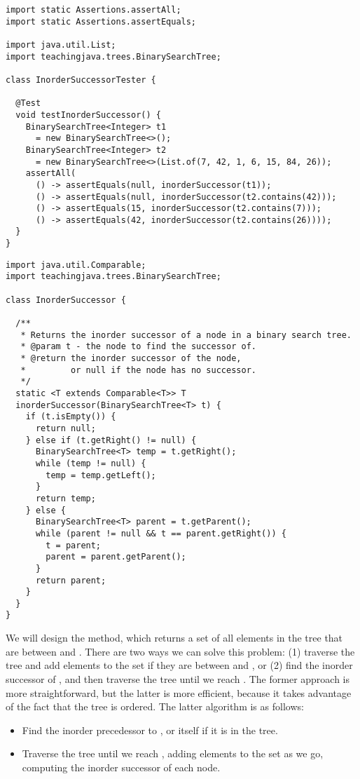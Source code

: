 \begin{lstlisting}[language=MyJava]
import static Assertions.assertAll;
import static Assertions.assertEquals;

import java.util.List;
import teachingjava.trees.BinarySearchTree;

class InorderSuccessorTester {

  @Test
  void testInorderSuccessor() {
    BinarySearchTree<Integer> t1 
      = new BinarySearchTree<>();
    BinarySearchTree<Integer> t2 
      = new BinarySearchTree<>(List.of(7, 42, 1, 6, 15, 84, 26));
    assertAll(
      () -> assertEquals(null, inorderSuccessor(t1));
      () -> assertEquals(null, inorderSuccessor(t2.contains(42)));
      () -> assertEquals(15, inorderSuccessor(t2.contains(7)));
      () -> assertEquals(42, inorderSuccessor(t2.contains(26))));
  }
}
\end{lstlisting}

\enlargethispage{6\baselineskip}
\begin{lstlisting}[language=MyJava]
import java.util.Comparable;
import teachingjava.trees.BinarySearchTree;

class InorderSuccessor {

  /**
   * Returns the inorder successor of a node in a binary search tree.
   * @param t - the node to find the successor of.
   * @return the inorder successor of the node, 
   *         or null if the node has no successor.
   */
  static <T extends Comparable<T>> T 
  inorderSuccessor(BinarySearchTree<T> t) {
    if (t.isEmpty()) {
      return null;
    } else if (t.getRight() != null) {
      BinarySearchTree<T> temp = t.getRight();
      while (temp != null) {
        temp = temp.getLeft();
      }
      return temp;
    } else {
      BinarySearchTree<T> parent = t.getParent();
      while (parent != null && t == parent.getRight()) {
        t = parent;
        parent = parent.getParent();
      }
      return parent;
    }
  }
}
\end{lstlisting}

We will design the  method, which returns a set of all elements in the tree that are between  and . 
There are two ways we can solve this problem: (1) traverse the tree and add elements to the set if they are between  and , or (2) find the inorder successor of , and then traverse the tree until we reach .
The former approach is more straightforward, but the latter is more efficient, because it takes advantage of the fact that the tree is ordered. 
The latter algorithm is as follows:
\begin{itemize}
  \item Find the inorder precedessor to , or  itself if it is in the tree.
  \item Traverse the tree until we reach , adding elements to the set as we go, computing the inorder successor of each node.
\end{itemize}

